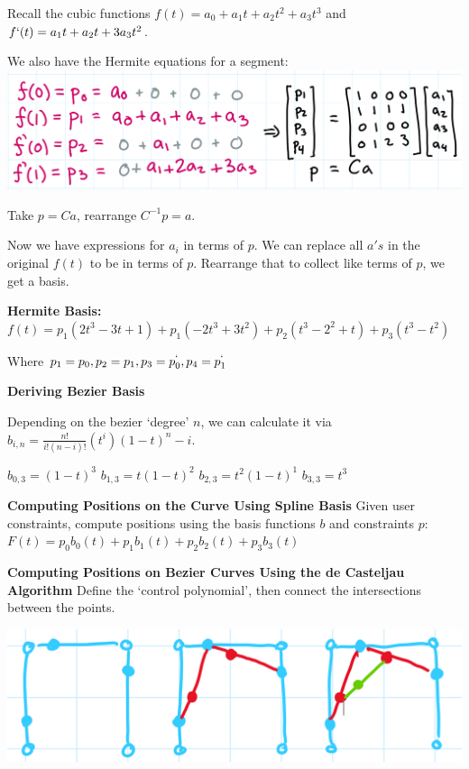 \documentclass[letterpaper, 8pt]{extarticle}
\begin{document}
\begin{multicols*}{4}
    Recall the cubic functions
    $f(t) = a_0 + a_1t + a_2t^2 + a_3t^3$ and
    $f`(t) = a_1t + a_2t + 3a_3t^2$.

    We also have the Hermite equations for a segment:
    \includegraphics[width=0.8\linewidth]{
        curve-basis-soe.png}

    Take $p=Ca$, rearrange $C^{-1}p=a$.

    Now we have expressions for $a_i$ in terms of $p$. We can replace all $a's$ in the original $f(t)$ to be in terms of $p$. Rearrange that to collect like terms of $p$, we get a basis.

    \textbf{Hermite Basis:}
    $f(t) = p_1(2t^3 - 3t + 1) + p_1(-2t^3+3t^2) + p_2(t^3-2^2 + t) + p_3(t^3-t^2)$

    Where $p_1 = p_0, p_2 = p_1, p_3 = p^`_0, p_4 = p^`_1$


    \textbf{Deriving Bezier Basis}

    Depending on the bezier `degree' $n$, we can calculate it via $b_{i,n} = \frac{n!}{i!(n-i)!}(t^i)(1-t)^n-i$.

    $b_{0,3} = (1-t)^3$
    $b_{1,3} = t(1-t)^2$
    $b_{2,3} = t^2(1-t)^1$
    $b_{3,3} = t^3$


    \textbf{Computing Positions on the Curve Using Spline Basis}
    Given user constraints, compute positions using the basis functions $b$ and constraints $p$: $F(t) = p_0b_0(t) + p_1b_1(t) + p_2b_2(t) + p_3b_3(t)$

    \textbf{Computing Positions on Bezier Curves Using the de Casteljau Algorithm}
    Define the `control polynomial', then connect the intersections between the points.

    \includegraphics[width=0.5\linewidth]{bezier.png}


\end{multicols*}
\end{document}
